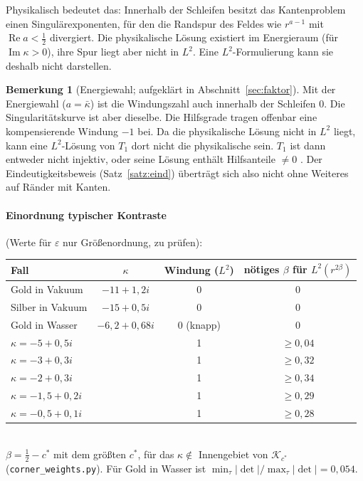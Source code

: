 \documentclass[11pt, a4paper]{article}
\theoremstyle{plain}
\theoremstyle{definition}
\newtheorem{bemerkung}[satz]{Bemerkung}
\begin{document}
Physikalisch bedeutet das: Innerhalb der Schleifen besitzt das Kantenproblem einen
Singulärexponenten, für den die Randspur des Feldes wie $r^{a-1}$ mit
$\operatorname{Re}a<\tfrac12$ divergiert. Die physikalische Lösung existiert im
Energieraum (für $\operatorname{Im}\kappa>0$), ihre Spur liegt aber nicht in
$L^2$. Eine $L^2$-Formulierung kann sie deshalb nicht darstellen.

\begin{bemerkung}[Energiewahl; aufgeklärt in Abschnitt~\ref{sec:faktor}]\label{bem:eckenergie}
Mit der Energiewahl ($a=\bar\kappa$) ist die Windungszahl auch innerhalb der
Schleifen $0$. Die Singularitätskurve ist aber dieselbe. Die Hilfsgrade tragen
offenbar eine kompensierende Windung $-1$ bei. Da die physikalische Lösung nicht in
$L^2$ liegt, kann eine $L^2$-Lösung von $T_1$ dort nicht die physikalische sein.
$T_1$ ist dann entweder nicht injektiv, oder seine Lösung enthält Hilfsanteile
$\neq0$ {\small{}}. Der Eindeutigkeitsbeweis
(Satz~\ref{satz:eind}) überträgt sich also nicht ohne Weiteres auf Ränder mit
Kanten.
\end{bemerkung}

\paragraph{Einordnung typischer Kontraste} (Werte für $\varepsilon$ nur
Größenordnung, zu prüfen):
\begin{center}\small
\begin{tabular}{lccc}
\toprule
Fall & $\kappa$ & Windung ($L^2$) & nötiges $\beta$ für $L^2(r^{2\beta})$\\
\midrule
Gold in Vakuum & $-11+1{,}2i$ & 0 & 0\\
Silber in Vakuum & $-15+0{,}5i$ & 0 & 0\\
Gold in Wasser & $-6{,}2+0{,}68i$ & 0 (knapp) & 0\\
$\kappa=-5+0{,}5i$ & & 1 & $\ge0{,}04$\\
$\kappa=-3+0{,}3i$ & & 1 & $\ge0{,}32$\\
$\kappa=-2+0{,}3i$ & & 1 & $\ge0{,}34$\\
$\kappa=-1{,}5+0{,}2i$ & & 1 & $\ge0{,}29$\\
$\kappa=-0{,}5+0{,}1i$ & & 1 & $\ge0{,}28$\\
\bottomrule
\end{tabular}\\[2pt]
{\footnotesize $\beta = \tfrac12-c^*$ mit dem größten $c^*$, für das $\kappa\notin$
Innengebiet von $\mathcal{K}_{c^*}$ (\texttt{corner\_weights.py}).
Für Gold in Wasser ist $\min_\tau|\det|/\max_\tau|\det| = 0{,}054$.}
\end{center}
\end{document}
